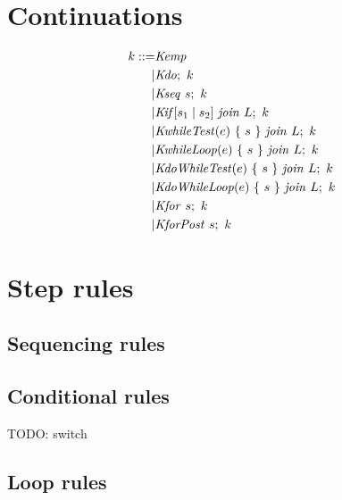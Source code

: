 \documentclass[acmsmall,review,anonymous]{acmart}\settopmatter{printfolios=true,printccs=false,printacmref=false}
\begin{document}


\appendix

\section{Continuations}
\label{app:continuations}

\[\begin{split}
k ::= & \mathit{Kemp} \\
| & \mathit{Kdo};~ k \\
| & \mathit{Kseq} ~ s; ~ k \\
| & \mathit{Kif}[s_1 \mid s_2] ~ \mathit{join} ~ L; ~ k \\
| & \mathit{KwhileTest}(e) ~ \{ ~ s ~ \} ~ \mathit{join} ~ L; ~ k \\
| & \mathit{KwhileLoop}(e) ~ \{ ~ s ~ \} ~ \mathit{join} ~ L; ~ k \\
| & \mathit{KdoWhileTest}(e) ~ \{ ~ s ~ \} ~ \mathit{join} ~ L; ~ k \\
| & \mathit{KdoWhileLoop}(e) ~ \{ ~ s ~ \} ~ \mathit{join} ~ L; ~ k \\
| & \mathit{Kfor} ~ s; ~ k \\
| & \mathit{KforPost} ~ s; ~ k \\
\end{split}\]

\section{Step rules}
\label{app:rules}

\subsection{Sequencing rules}

\dostepa
\dostepb
\seqstep
\seqskipstep
\seqcontinuestep
\seqbreakstep
\retvalstep
{}

\subsection{Conditional rules}

\ifstepa
\ifstepb

TODO: switch

\subsection{Loop rules}

\whilestep
\whiletruestep
\whilefalsestep
\whileskipcontinuestep
\whilebreakstep

\dowhilestep
\dowhileskipcontinuestep
\dowhilefalsestep
\dowhiletruestep
\dowhilebreakstep
\end{document}
